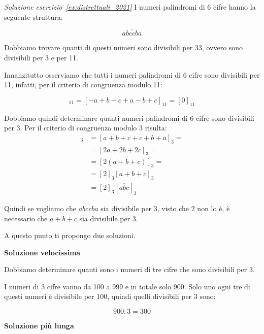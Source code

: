 \begin{soluzione}
    \emph{Soluzione esercizio~\ref{ex:distrettuali_2021}}
    I numeri palindromi di 6 cifre hanno la seguente struttura:

    \begin{equation*}
        \overline{abccba}
    \end{equation*}

    Dobbiamo trovare quanti di questi numeri sono divisibili per 33, ovvero sono divisibili per 3 e per 11.

    Innanzitutto osserviamo che tutti i numeri palindromi di 6 cifre sono divisibili per 11, infatti, per il
    criterio di congruenza modulo 11:

    \begin{equation*}
        [\overline{abccba}]_{11} = [-a + b - c + a - b + c]_{11} = [0]_{11}
    \end{equation*}

    Dobbiamo quindi determinare quanti numeri palindromi di 6 cifre sono divisibili per 3.
    Per il criterio di congruenza modulo 3 risulta:
    \begin{align*}
        [\overline{abccba}]_3 &= [a + b + c + c + b + a]_3 = \\
        &= [2a + 2b + 2c]_3 = \\
        &= [2(a+b+c)]_3 = \\
        &= [2]_3[a + b + c]_3 \\
        &= [2]_3[\overline{abc}]_3
    \end{align*}

    Quindi se vogliamo che $\overline{abccba}$ sia divisibile per 3, visto che 2 non lo è, è necessario che $a + b + c$
    sia divisibile per 3.

    A questo punto ti propongo due soluzioni.

    \bigskip
    \textbf{Soluzione velocissima}

    Dobbiamo determinare quanti sono i numeri di tre cifre che sono divisibili per 3.

    I numeri di 3 cifre vanno da 100 a 999 e in totale solo 900.
    Solo uno ogni tre di questi numeri è divisibile per 100, quindi quelli divisibili per 3 sono:

    \begin{equation*}
        900 : 3 = 300
    \end{equation*}

    \bigskip
    \textbf{Soluzione più lunga}


\end{soluzione}
